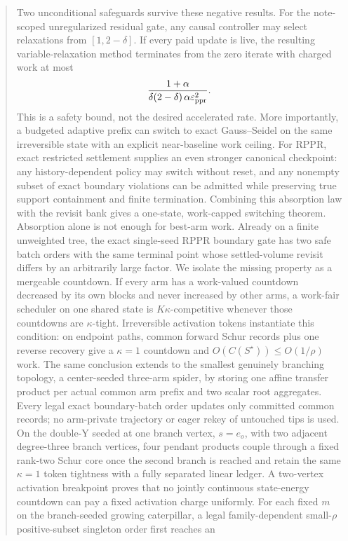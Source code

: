 \documentclass[11pt]{article}
\begin{document}
\begin{abstract}
Two unconditional safeguards survive these negative results.  For the
note-scoped unregularized residual gate, any causal controller may select
relaxations from $[1,2-\delta]$.  If every paid update is live, the resulting
variable-relaxation method terminates from the zero iterate with charged work
at most
\[
 \frac{1+\alpha}
 {\delta(2-\delta)\,\alpha\epsppr^{2}}.
\]
This is a safety bound, not the desired accelerated rate.  More importantly,
a budgeted adaptive prefix can switch to exact Gauss--Seidel on the same
irreversible state with an explicit near-baseline work ceiling.  For RPPR,
exact restricted settlement supplies an even stronger canonical checkpoint:
any history-dependent policy may switch without reset, and any nonempty
subset of exact boundary violations can be admitted while preserving true
support containment and finite termination.  Combining this absorption law
with the revisit bank gives a one-state, work-capped switching theorem.
Absorption alone is not enough for best-arm work.  Already on a finite
unweighted tree, the exact single-seed RPPR boundary gate has two safe batch
orders with the same terminal point whose settled-volume revisit differs by
an arbitrarily large factor.  We isolate the missing property as a mergeable
countdown.  If every arm has a work-valued countdown decreased by its own
blocks and never increased by other arms, a work-fair scheduler on one shared
state is $K\kappa$-competitive whenever those countdowns are
$\kappa$-tight.  Irreversible activation tokens instantiate this condition:
on endpoint paths, common forward Schur records plus one reverse recovery
give a $\kappa=1$ countdown and $O(C(S^\star))\leq O(1/\rho)$ work.  The same
conclusion extends to the smallest genuinely branching topology, a
center-seeded three-arm spider, by storing one affine transfer product per
actual common arm prefix and two scalar root aggregates.  Every legal exact
boundary-batch order updates only committed common records; no arm-private
trajectory or eager rekey of untouched tips is used.  On the double-Y seeded
at one branch vertex, $s=e_o$, with two adjacent degree-three branch vertices,
four pendant products couple through a
fixed rank-two Schur core once the second branch is reached and retain the same
$\kappa=1$ token tightness with a fully separated linear ledger.  A two-vertex
activation breakpoint proves that no jointly continuous
state-energy countdown can pay a fixed activation charge uniformly.
For each fixed $m$ on the branch-seeded growing caterpillar, a legal
family-dependent small-$\rho$ positive-subset singleton order first reaches an

\end{abstract}
\end{document}
